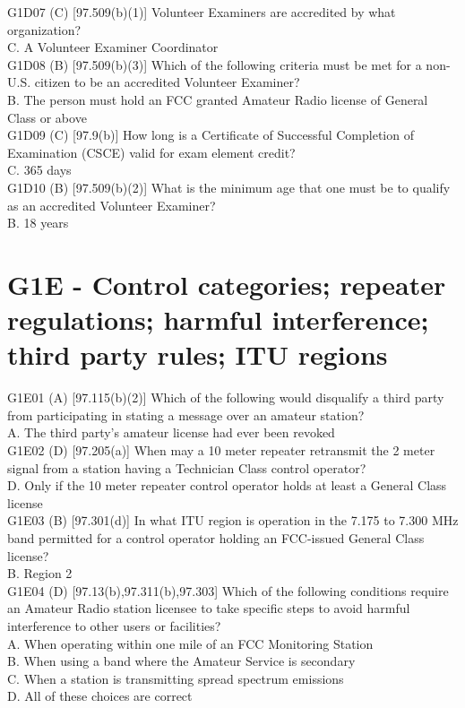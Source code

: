 \documentclass[12pt,letterpaper]{report}
\begin{document}
G1D07 (C) [97.509(b)(1)] Volunteer Examiners are accredited by what organization?\\
C. A Volunteer Examiner Coordinator\\

G1D08 (B) [97.509(b)(3)] Which of the following criteria must be met for a non-U.S. citizen to be an accredited Volunteer Examiner?\\
B. The person must hold an FCC granted Amateur Radio license of General Class or above\\

G1D09 (C) [97.9(b)] How long is a Certificate of Successful Completion of Examination (CSCE) valid for exam element credit?\\
C. 365 days\\

G1D10 (B) [97.509(b)(2)] What is the minimum age that one must be to qualify as an accredited Volunteer Examiner?\\
B. 18 years\\

\section{G1E - Control categories; repeater regulations; harmful interference; third party rules; ITU regions}

G1E01 (A) [97.115(b)(2)] Which of the following would disqualify a third party from participating in stating a message over an amateur station?\\
A. The third party's amateur license had ever been revoked \\

G1E02 (D) [97.205(a)] When may a 10 meter repeater retransmit the 2 meter signal from a station having a Technician Class control operator?\\
D. Only if the 10 meter repeater control operator holds at least a General Class license\\

G1E03 (B) [97.301(d)] In what ITU region is operation in the 7.175 to 7.300 MHz band permitted for a control operator holding an FCC-issued General Class license?\\
B. Region 2\\

G1E04 (D) [97.13(b),97.311(b),97.303] Which of the following conditions require an Amateur Radio station licensee to take specific steps to avoid harmful interference to other users or facilities?\\
A. When operating within one mile of an FCC Monitoring Station\\
B. When using a band where the Amateur Service is secondary\\
C. When a station is transmitting spread spectrum emissions\\
D. All of these choices are correct\\
\end{document}

